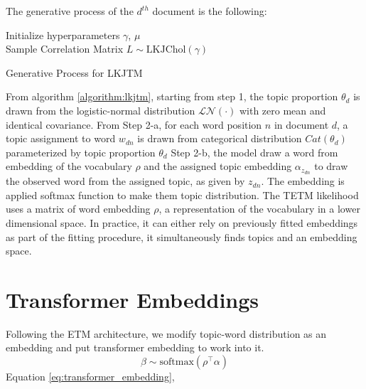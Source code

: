 The generative process of the $ d^{th} $ document is the following:\\
\begin{algorithm}[H]
Initialize hyperparameters $ \gamma $, $ \mu $\\
Sample Correlation Matrix $ L\sim \text{LKJChol}(\gamma)$\\
\caption{Generative Process for LKJTM}
\label{algorithm:lkjtm}
\end{algorithm}
From algorithm \ref{algorithm:lkjtm}, starting from step 1, the topic proportion $ \theta_d $ is drawn from the logistic-normal distribution $ \mathcal{LN}(\cdot) $ with zero mean and identical covariance.
From Step 2-a, for each word position $ n $ in document $ d $, a topic assignment to word $ w_{dn} $ is drawn from categorical distribution $ Cat(\theta_d) $ parameterized by topic proportion $ \theta_d $
Step 2-b, the model draw a word from embedding of the vocabulary $ \rho $ and the assigned topic embedding $ \alpha_{z_{dn}} $ to draw the observed word from the assigned topic, as given by $ z_{dn} $. The embedding is applied softmax function to make them topic distribution.
The TETM likelihood uses a matrix of word embedding $ \rho $, a representation of the vocabulary in a lower dimensional space. In practice, it can either rely on previously fitted embeddings as part of the fitting procedure, it simultaneously finds topics and an embedding space.


\section{Transformer Embeddings}
Following the ETM architecture, we modify topic-word distribution as an embedding and put transformer embedding to work into it. 
\begin{equation}\label{eq:transformer_embedding}
\beta\sim\text{softmax}(\rho^\top\alpha)
\end{equation}
Equation \ref{eq:transformer_embedding}, 
